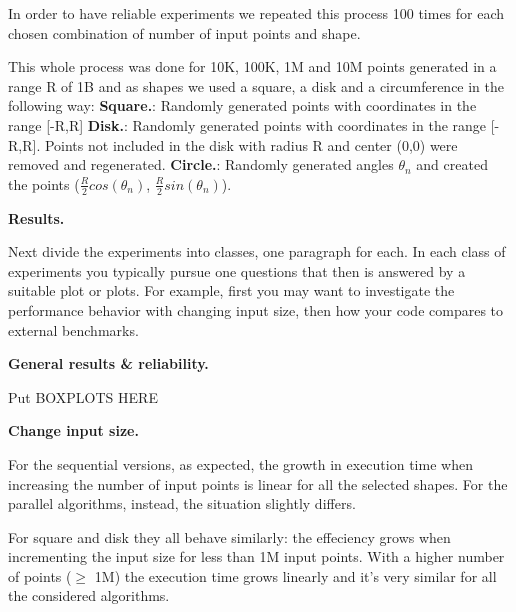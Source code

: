 \documentclass[letterpaper]{article}
\newcommand{\mypar}[1]{{\bf #1.}}
\begin{document}
In order to have reliable experiments we repeated this process 100 times for each chosen combination of number of input points and shape.

This whole process was done for 10K, 100K, 1M and 10M points generated in a range R of 1B and as shapes we used a square, a disk and a circumference in the following way:
\mypar{Square}: Randomly generated points with coordinates in the range [-R,R]
\mypar{Disk}: Randomly generated points with coordinates in the range [-R,R]. Points not included in the disk with radius R and center (0,0) were removed and regenerated.
\mypar{Circle}: Randomly generated angles $\theta_n$ and created the points ($\frac{R}{2}cos(\theta_n)$, $\frac{R}{2}sin(\theta_n)$).

\mypar{Results}

Next divide the experiments into classes, one paragraph for each. In each class of experiments you typically pursue one questions that then is answered by a suitable plot or plots. For example, first you may want to investigate the performance behavior with changing input size, then how your code compares to external benchmarks.

\mypar{General results & reliability}

Put BOXPLOTS HERE

\mypar{Change input size}

For the sequential versions, as expected, the growth in execution time when increasing the number of input points is linear for all the selected shapes.
For the parallel algorithms, instead, the situation slightly differs.

For square and disk they all behave similarly: the effeciency grows when incrementing the input size for less than 1M input points. With a higher number of points ($\geq$ 1M) the execution time grows linearly and it's very similar for all the considered algorithms.
\end{document}
